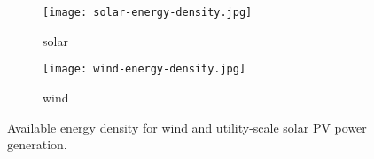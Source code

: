 
\begin{figure}
    \centering
    \begin{subfigure}[t]{0.49\textwidth}
        \centering
        \caption{solar}
        \texttt{[image: solar-energy-density.jpg]}
    \end{subfigure}
    \begin{subfigure}[t]{0.49\textwidth}
        \centering
        \caption{wind}
        \texttt{[image: wind-energy-density.jpg]}
    \end{subfigure}
    \caption{Available energy density for wind and utility-scale solar PV power generation.}
    \label{fig:energy-density}
\end{figure}

